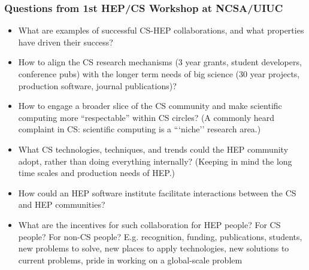 \begin{frame}
\frametitle{Questions from 1st HEP/CS Workshop at NCSA/UIUC}

\footnotesize{
\begin{itemize}
\item What are examples of successful CS-HEP collaborations, and what properties have driven their success?
\item How to align the CS research mechanisms (3 year grants, student developers, conference pubs) with the longer term needs of big science (30 year projects, production software, journal publications)?
\item How to engage a broader slice of the CS community and make scientific computing more “respectable” within CS circles?  (A commonly heard complaint in CS: scientific computing is a ```niche'' research area.)
\item What CS technologies, techniques, and trends could the HEP community adopt, rather than doing everything internally?  (Keeping in mind the long time scales and production needs of HEP.)
\item How could an HEP software institute facilitate interactions between the CS and HEP communities? 
\item What are the incentives for such collaboration for HEP people?  For CS people?  For non-CS people?  E.g. recognition, funding, publications, students, new problems to solve, new places to apply technologies, new solutions to current problems, pride in working on a global-scale problem
\end{itemize}
}

\end{frame}


